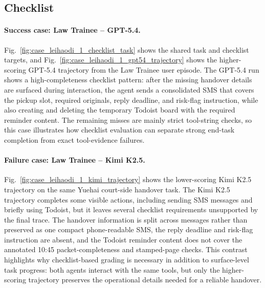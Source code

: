 \documentclass{llmxive}
\begin{document}
\subsection{Checklist}
\paragraph{Success case: Law Trainee -- GPT-5.4.}
Fig.~\ref{fig:case_leihaodi_1_checklist_task} shows the shared task and checklist targets, and Fig.~\ref{fig:case_leihaodi_1_gpt54_trajectory} shows the higher-scoring GPT-5.4 trajectory from the Law Trainee user episode.
The GPT-5.4 run shows a high-completeness checklist pattern: after the missing handover details are surfaced during interaction, the agent sends a consolidated SMS that covers the pickup slot, required originals, reply deadline, and risk-flag instruction, while also creating and deleting the temporary Todoist board with the required reminder content.
The remaining misses are mainly strict tool-string checks, so this case illustrates how checklist evaluation can separate strong end-task completion from exact tool-evidence failures.

\paragraph{Failure case: Law Trainee -- Kimi K2.5.}
Fig.~\ref{fig:case_leihaodi_1_kimi_trajectory} shows the lower-scoring Kimi K2.5 trajectory on the same Yuehai court-side handover task.
The Kimi K2.5 trajectory completes some visible actions, including sending SMS messages and briefly using Todoist, but it leaves several checklist requirements unsupported by the final trace.
The handover information is split across messages rather than preserved as one compact phone-readable SMS, the reply deadline and risk-flag instruction are absent, and the Todoist reminder content does not cover the annotated 10:45 packet-completeness and stamped-page checks.
This contrast highlights why checklist-based grading is necessary in addition to surface-level task progress: both agents interact with the same tools, but only the higher-scoring trajectory preserves the operational details needed for a reliable handover.
\end{document}
